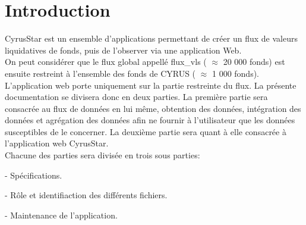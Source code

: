 \chapter{Introduction}

CyrusStar est un ensemble d'applications permettant de créer un flux de valeurs liquidatives de fonds, puis de l'observer via une application Web.\\
On peut considérer que le flux global appellé flux{\_}vls ( $\approx$ 20 000 fonds) est ensuite restreint à l'ensemble des fonds de CYRUS ( $\approx$ 1 000 fonds). L'application web porte uniquement sur la partie restreinte du flux.
La présente documentation se divisera donc en deux parties. La première partie sera consacrée au flux de données en lui même, obtention des données, intégration des données et agrégation des données afin ne fournir à l'utilisateur que les données susceptibles de le concerner. La deuxième partie sera quant à elle consacrée à l'application web CyrusStar.\\
Chacune des parties sera divisée en trois sous parties:
\begin{list}{-}{}
	\item[-] Spécifications.
	\item[-] Rôle et identifiaction des différents fichiers.
	\item[-] Maintenance de l'application.
\end{list}

\clearpage
